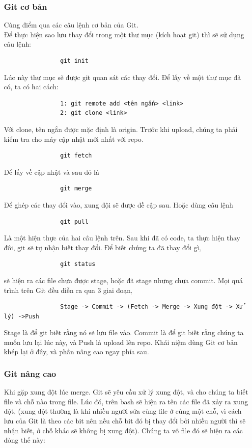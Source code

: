\documentclass[12pt,a4paper]{report}
\begin{document}
			\subsubsection{Git cơ bản}

			Cùng điểm qua các câu lệnh cơ bản của Git.\\
			Để thực hiện sao lưu thay đổi trong một thư mục (kích hoạt git) thì sẽ sử dụng câu lệnh:
			\begin{verbatim}
				git init
			\end{verbatim}
			Lúc này thư mục sẽ được git quan sát các thay đổi.
			Để lấy về một thư mục đã có, ta có hai cách:
			\begin{verbatim}
				1: git remote add <tên ngắn> <link>
				2: git clone <link>
			\end{verbatim}
			Với clone, tên ngắn được mặc định là origin.
			Trước khi upload, chúng ta phải kiểm tra cho máy cập nhật mới nhất với repo.
			\begin{verbatim}
				git fetch
			\end{verbatim}
			Để lấy về cập nhật và sau đó là
			\begin{verbatim}
				git merge
			\end{verbatim}
			Để ghép các thay đổi vào, xung đội sẽ được đề cập sau.
			Hoặc dùng câu lệnh
			\begin{verbatim}
				git pull
			\end{verbatim}
			Là một hiện thực của hai câu lệnh trên.
			Sau khi đã có code, ta thực hiện thay đôi, git sẽ tự nhận biết thay đổi. Để biết chúng ta đã thay đổi gì,
			\begin{verbatim}
				git status
			\end{verbatim}
			sẽ hiện ra các file chưa được stage, hoặc đã stage nhưng chưa commit.
			Mọi quá trình trên Git đều diễn ra qua 3 giai đoạn,
			\begin{verbatim}
				Stage -> Commit -> (Fetch -> Merge -> Xung đột -> Xử lý) ->Push
			\end{verbatim}
			Stage là để git biết rằng nó sẽ lưu file vào. Commit là để git biết rằng chúng ta muốn lưu lại lúc này, và Push là upload lên repo.
			Khái niệm dùng Git cơ bản khép lại ở đây, và phần nâng cao ngay phía sau.

			\subsubsection{Git nâng cao}
			Khi gặp xung đột lúc merge. Git sẽ yêu cầu xử lý xung đột, và cho chúng ta biết file và chỗ nào trong file. Lúc đó, trên bash sẽ hiện ra tên các file đã xảy ra xung đột, (xung đột thường là khi nhiều người sửa cùng file ở cùng một chỗ, vì cách lưu của Git là theo các bit nên nếu chỗ bit đó bị thay đổi bởi nhiều người thì sẽ nhận biết, ở chỗ khác sẽ không bị xung đột). Chúng ta vô file đó sẽ hiện ra các dòng thế này:\par
\end{document}

